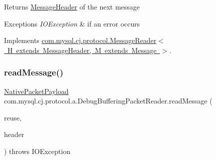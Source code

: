 \begin{DoxyReturn}{Returns}
\mbox{\hyperlink{interfacecom_1_1mysql_1_1cj_1_1protocol_1_1_message_header}{Message\+Header}} of the next message 
\end{DoxyReturn}

\begin{DoxyExceptions}{Exceptions}
{\em I\+O\+Exception} & if an error occurs \\
\hline
\end{DoxyExceptions}


Implements \mbox{\hyperlink{interfacecom_1_1mysql_1_1cj_1_1protocol_1_1_message_reader_a09745b0e30f74fa13e2b32f22ce70cbb}{com.\+mysql.\+cj.\+protocol.\+Message\+Reader$<$ H extends Message\+Header, M extends Message $>$}}.

\mbox{\label{classcom_1_1mysql_1_1cj_1_1protocol_1_1a_1_1_debug_buffering_packet_reader_a50c66cbcfdd3b08a8135f3b6eb91cd19}} 
\subsubsection{\texorpdfstring{read\+Message()}{readMessage()}}
{\footnotesize\ttfamily \mbox{\hyperlink{classcom_1_1mysql_1_1cj_1_1protocol_1_1a_1_1_native_packet_payload}{Native\+Packet\+Payload}} com.\+mysql.\+cj.\+protocol.\+a.\+Debug\+Buffering\+Packet\+Reader.\+read\+Message (\begin{DoxyParamCaption}\item[{Optional$<$ \mbox{\hyperlink{classcom_1_1mysql_1_1cj_1_1protocol_1_1a_1_1_native_packet_payload}{Native\+Packet\+Payload}} $>$}]{reuse,  }\item[{\mbox{\hyperlink{classcom_1_1mysql_1_1cj_1_1protocol_1_1a_1_1_native_packet_header}{Native\+Packet\+Header}}}]{header }\end{DoxyParamCaption}) throws I\+O\+Exception}

\mbox{\label{classcom_1_1mysql_1_1cj_1_1protocol_1_1a_1_1_debug_buffering_packet_reader_a6739a6433fdce69bb684e15048481dc2}} 
